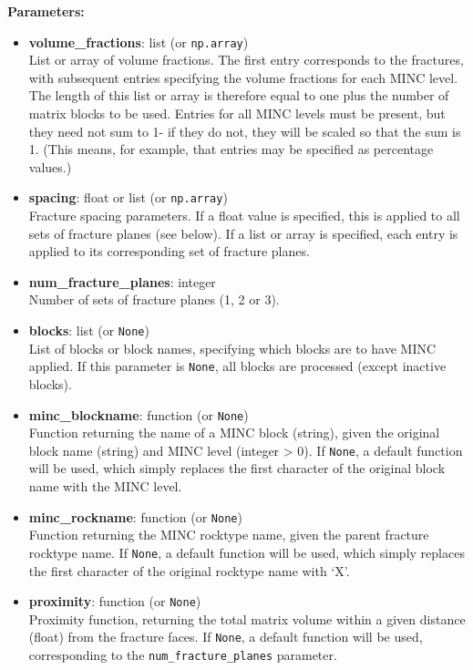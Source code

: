\textbf{Parameters:}
\begin{itemize}
\item \textbf{volume\_fractions}: list (or \texttt{np.array})\\
  List or array of volume fractions. The first entry corresponds to the fractures, with subsequent entries specifying the volume fractions for each MINC level. The length of this list or array is therefore equal to one plus the number of matrix blocks to be used. Entries for all MINC levels must be present, but they need not sum to 1- if they do not, they will be scaled so that the sum is 1. (This means, for example, that entries may be specified as percentage values.)
\item \textbf{spacing}: float or list (or \texttt{np.array})\\
  Fracture spacing parameters. If a float value is specified, this is applied to all sets of fracture planes (see below). If a list or array is specified, each entry is applied to its corresponding set of fracture planes.
\item \textbf{num\_fracture\_planes}: integer\\
  Number of sets of fracture planes (1, 2 or 3).
\item \textbf{blocks}: list (or \texttt{None})\\
  List of blocks or block names, specifying which blocks are to have MINC applied. If this parameter is \texttt{None}, all blocks are processed (except inactive blocks).
\item \textbf{minc\_blockname}: function (or \texttt{None})\\
  Function returning the name of a MINC block (string), given the original block name (string) and MINC level (integer > 0). If \texttt{None}, a default function will be used, which simply replaces the first character of the original block name with the MINC level.
\item \textbf{minc\_rockname}: function (or \texttt{None})\\
  Function returning the MINC rocktype name, given the parent fracture rocktype name. If \texttt{None}, a default function will be used, which simply replaces the first character of the original rocktype name with `X'.
\item \textbf{proximity}: function (or \texttt{None})\\
  Proximity function, returning the total matrix volume within a given distance (float) from the fracture faces. If \texttt{None}, a default function will be used, corresponding to the \texttt{num\_fracture\_planes} parameter.

\end{itemize}

